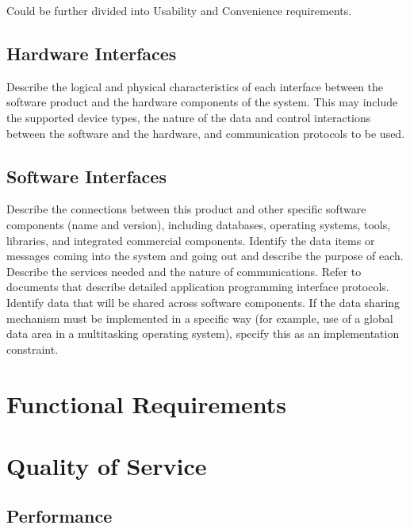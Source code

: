 Could be further divided into Usability and Convenience requirements.

\subsection{Hardware Interfaces}

Describe the logical and physical characteristics of each interface between the
software product and the hardware components of the system. This may include the
supported device types, the nature of the data and control interactions between
the software and the hardware, and communication protocols to be used.

\subsection{Software Interfaces}

Describe the connections between this product and other specific software
components (name and version), including databases, operating systems, tools,
libraries, and integrated commercial components. Identify the data items or
messages coming into the system and going out and describe the purpose of each.
Describe the services needed and the nature of communications. Refer to
documents that describe detailed application programming interface protocols.
Identify data that will be shared across software components. If the data
sharing mechanism must be implemented in a specific way (for example, use of a
global data area in a multitasking operating system), specify this as an
implementation constraint.

\section{Functional Requirements}


\section{Quality of Service}


\subsection{Performance}

